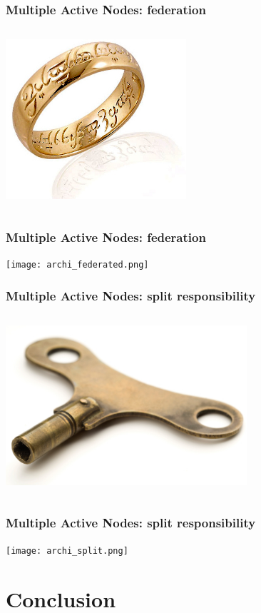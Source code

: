 \documentclass{beamer}
\begin{document}
\begin{frame}
  \frametitle{Multiple Active Nodes: federation}

\begin{columns}[c]
  \includegraphics[height=16em]{the-one-ring.jpg}
\end{columns}
\end{frame}

\begin{frame}
  \frametitle{Multiple Active Nodes: federation}

  \texttt{[image: archi\_federated.png]}
\end{frame}

\begin{frame}
  \frametitle{Multiple Active Nodes: split responsibility}

\begin{columns}[c]
  \includegraphics[height=16em]{clock-key.jpg}
\end{columns}
\end{frame}

\begin{frame}
  \frametitle{Multiple Active Nodes: split responsibility}

  \texttt{[image: archi\_split.png]}
\end{frame}

\section{Conclusion}

\end{document}
